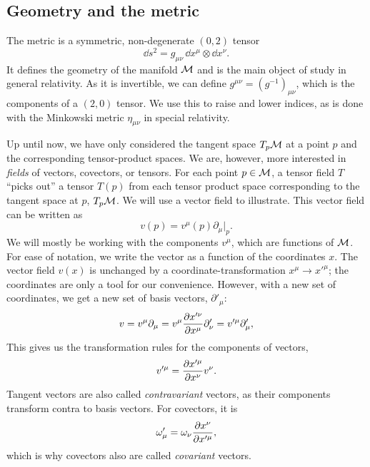 \subsection{Geometry and the metric}
\label{subsection: goemetry and the metric}

The metric is a symmetric, non-degenerate $(0, 2)$ tensor
%
\begin{equation}
    \dd s^2 = g_{\mu \nu} \, \dd x^\mu \otimes \dd x^\nu.
\end{equation}
%
It defines the geometry of the manifold $\mathcal{M}$ and is the main object of study in general relativity.
As it is invertible, we can define $g^{\mu \nu} = (g^{-1})_{\mu \nu}$, which is the components of a $(2, 0)$ tensor.
We use this to raise and lower indices, as is done with the Minkowski metric $\eta_{\mu \nu}$ in special relativity.

Up until now, we have only considered the tangent space $T_p \mathcal{M}$ at a point $p$ and the corresponding tensor-product spaces.
We are, however, more interested in \emph{fields} of vectors, covectors, or tensors.
For each point $p \in \mathcal{M}$, a tensor field $T$ ``picks out'' a tensor $T(p)$ from each tensor product space corresponding to the tangent space at $p$, $T_p \mathcal{M}$.
We will use a vector field to illustrate.
This vector field can be written as
%
\begin{equation}
    v(p) = v^\mu(p) \partial_\mu |_p. 
\end{equation}
%
We will mostly be working with the components $v^\mu$, which are functions of $\mathcal{M}$.
For ease of notation, we write the vector as a function of the coordinates $x$.
The vector field $v(x)$ is unchanged by a coordinate-transformation $x^\mu \rightarrow {x'}^\mu$; the coordinates are only a tool for our convenience.
However, with a new set of coordinates, we get a new set of basis vectors, $\partial'_\mu$:
%
\begin{equation}
    v = v^\mu \partial_\mu = v^\mu \pdv{x'^\nu}{x^\mu} \partial'_\nu
    = v'^\mu \partial_\mu',
\end{equation}
%
This gives us the transformation rules for the components of vectors,
%
\begin{equation}
    v'^\mu = \pdv{x'^\mu}{x^\nu} v^\nu.
\end{equation}
%
Tangent vectors are also called \emph{contravariant} vectors, as their components transform contra to basis vectors.
For covectors, it is
%
\begin{equation}
    \omega'_\mu = \omega_\nu \pdv{x^\nu}{x'^\mu},
\end{equation}
%
which is why covectors also are called \emph{covariant} vectors.

